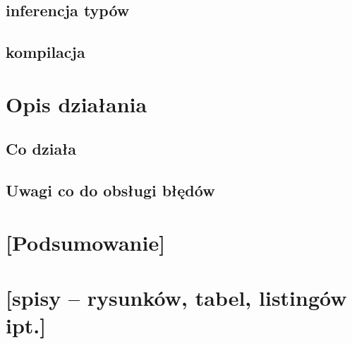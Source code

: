\documentclass{article}
\begin{document}
\subsection{inferencja typów}
\subsection{kompilacja}
\section{Opis działania}
\subsection{Co działa}
\subsection{Uwagi co do obsługi błędów}
\section{[Podsumowanie]}
\section{[spisy -- rysunków, tabel, listingów ipt.]}


\end{document}

